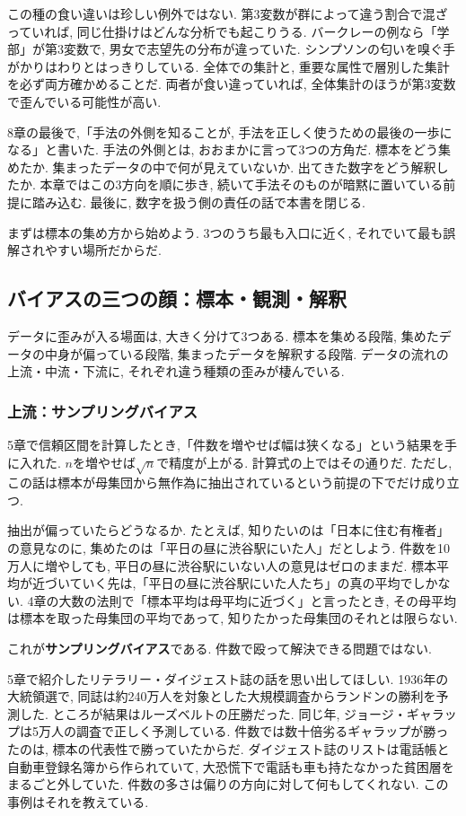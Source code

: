 この種の食い違いは珍しい例外ではない.
第3変数が群によって違う割合で混ざっていれば, 同じ仕掛けはどんな分析でも起こりうる.
バークレーの例なら「学部」が第3変数で, 男女で志望先の分布が違っていた.
シンプソンの匂いを嗅ぐ手がかりはわりとはっきりしている. 全体での集計と, 重要な属性で層別した集計を必ず両方確かめることだ.
両者が食い違っていれば, 全体集計のほうが第3変数で歪んでいる可能性が高い.

8章の最後で,「手法の外側を知ることが, 手法を正しく使うための最後の一歩になる」と書いた.
手法の外側とは, おおまかに言って3つの方角だ.
標本をどう集めたか. 集まったデータの中で何が見えていないか. 出てきた数字をどう解釈したか.
本章ではこの3方向を順に歩き, 続いて手法そのものが暗黙に置いている前提に踏み込む.
最後に, 数字を扱う側の責任の話で本書を閉じる.

まずは標本の集め方から始めよう.
3つのうち最も入口に近く, それでいて最も誤解されやすい場所だからだ.


\subsection{バイアスの三つの顔：標本・観測・解釈}

データに歪みが入る場面は, 大きく分けて3つある.
標本を集める段階, 集めたデータの中身が偏っている段階, 集まったデータを解釈する段階.
データの流れの上流・中流・下流に, それぞれ違う種類の歪みが棲んでいる.

\subsubsection*{上流：サンプリングバイアス}

5章で信頼区間を計算したとき,「件数を増やせば幅は狭くなる」という結果を手に入れた.
$n$を増やせば$\sqrt{n}$で精度が上がる. 計算式の上ではその通りだ.
ただし, この話は標本が母集団から無作為に抽出されているという前提の下でだけ成り立つ.

抽出が偏っていたらどうなるか.
たとえば, 知りたいのは「日本に住む有権者」の意見なのに, 集めたのは「平日の昼に渋谷駅にいた人」だとしよう.
件数を10万人に増やしても, 平日の昼に渋谷駅にいない人の意見はゼロのままだ.
標本平均が近づいていく先は,「平日の昼に渋谷駅にいた人たち」の真の平均でしかない.
4章の大数の法則で「標本平均は母平均に近づく」と言ったとき, その母平均は標本を取った母集団の平均であって, 知りたかった母集団のそれとは限らない.

これが\textbf{サンプリングバイアス}である. 件数で殴って解決できる問題ではない.

5章で紹介したリテラリー・ダイジェスト誌の話を思い出してほしい.
1936年の大統領選で, 同誌は約240万人を対象とした大規模調査からランドンの勝利を予測した.
ところが結果はルーズベルトの圧勝だった. 同じ年, ジョージ・ギャラップは5万人の調査で正しく予測している.
件数では数十倍劣るギャラップが勝ったのは, 標本の代表性で勝っていたからだ.
ダイジェスト誌のリストは電話帳と自動車登録名簿から作られていて, 大恐慌下で電話も車も持たなかった貧困層をまるごと外していた.
件数の多さは偏りの方向に対して何もしてくれない. この事例はそれを教えている.


